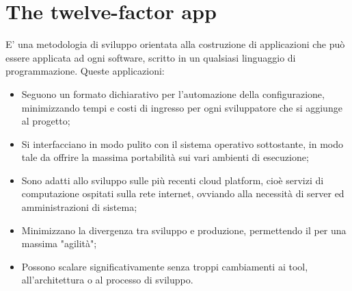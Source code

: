 \documentclass[PianoDiQualifica.tex]{subfiles}
\begin{document}
\chapter{The twelve-factor app}
E' una metodologia di sviluppo orientata alla costruzione di applicazioni  che può essere applicata ad ogni software, scritto in un qualsiasi linguaggio di programmazione.
Queste applicazioni:
\begin{itemize}
\item Seguono un formato dichiarativo per l'automazione della configurazione, minimizzando tempi e costi di ingresso per ogni sviluppatore che si aggiunge al progetto;
\item Si interfacciano in modo pulito con il sistema operativo sottostante, in modo tale da offrire la massima portabilità sui vari ambienti di esecuzione;
\item Sono adatti allo sviluppo sulle più recenti cloud platform, cioè servizi di computazione ospitati sulla rete internet, ovviando alla necessità di server ed amministrazioni di sistema;
\item Minimizzano la divergenza tra sviluppo e produzione, permettendo il  per una massima "agilità";
\item Possono scalare significativamente senza troppi cambiamenti ai tool, all'architettura o al processo di sviluppo.
\end{itemize}
\end{document}
